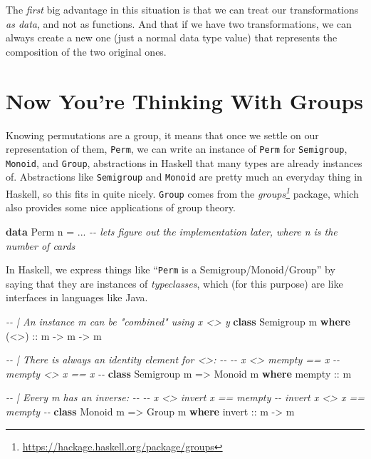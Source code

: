 \documentclass[]{article}
\newenvironment{Shaded}{}{}
\newcommand{\CommentTok}[1]{\textcolor[rgb]{0.38,0.63,0.69}{\textit{#1}}}
\newcommand{\DataTypeTok}[1]{\textcolor[rgb]{0.56,0.13,0.00}{#1}}
\newcommand{\KeywordTok}[1]{\textcolor[rgb]{0.00,0.44,0.13}{\textbf{#1}}}
\newcommand{\NormalTok}[1]{#1}
\newcommand{\OperatorTok}[1]{\textcolor[rgb]{0.40,0.40,0.40}{#1}}
\newcommand{\OtherTok}[1]{\textcolor[rgb]{0.00,0.44,0.13}{#1}}
\renewcommand{\href}[2]{#2\footnote{\url{#1}}}
\begin{document}
The \emph{first} big advantage in this situation is that we can treat our
transformations \emph{as data}, and not as functions. And that if we have two
transformations, we can always create a new one (just a normal data type value)
that represents the composition of the two original ones.

\hypertarget{now-youre-thinking-with-groups}{%
\section{Now You're Thinking With Groups}\label{now-youre-thinking-with-groups}}

Knowing permutations are a group, it means that once we settle on our
representation of them, \texttt{Perm}, we can write an instance of \texttt{Perm}
for \texttt{Semigroup}, \texttt{Monoid}, and \texttt{Group}, abstractions in
Haskell that many types are already instances of. Abstractions like
\texttt{Semigroup} and \texttt{Monoid} are pretty much an everyday thing in
Haskell, so this fits in quite nicely. \texttt{Group} comes from the
\emph{\href{https://hackage.haskell.org/package/groups}{groups}} package, which
also provides some nice applications of group theory.

\begin{Shaded}
\begin{Highlighting}[]
\KeywordTok{data} \DataTypeTok{Perm}\NormalTok{ n }\OtherTok{=} \OperatorTok{...} \CommentTok{{-}{-} let\textquotesingle{}s figure out the implementation later, where n is the number of cards}
\end{Highlighting}
\end{Shaded}

In Haskell, we express things like ``\texttt{Perm} is a Semigroup/Monoid/Group''
by saying that they are instances of \emph{typeclasses}, which (for this
purpose) are like interfaces in languages like Java.

\begin{Shaded}
\begin{Highlighting}[]
\CommentTok{{-}{-} | An instance m can be "combined" using \textasciigrave{}x <> y\textasciigrave{}}
\KeywordTok{class} \DataTypeTok{Semigroup}\NormalTok{ m }\KeywordTok{where}
\OtherTok{    (<>) ::}\NormalTok{ m }\OtherTok{{-}>}\NormalTok{ m }\OtherTok{{-}>}\NormalTok{ m}

\CommentTok{{-}{-} | There is always an identity element for <>:}
\CommentTok{{-}{-}}
\CommentTok{{-}{-} x <> mempty == x}
\CommentTok{{-}{-} mempty <> x == x}
\CommentTok{{-}{-}}
\KeywordTok{class} \DataTypeTok{Semigroup}\NormalTok{ m }\OtherTok{=>} \DataTypeTok{Monoid}\NormalTok{ m }\KeywordTok{where}
\OtherTok{    mempty ::}\NormalTok{ m}

\CommentTok{{-}{-} | Every m has an inverse:}
\CommentTok{{-}{-}}
\CommentTok{{-}{-} x <> invert x == mempty}
\CommentTok{{-}{-} invert x <> x == mempty}
\CommentTok{{-}{-}}
\KeywordTok{class} \DataTypeTok{Monoid}\NormalTok{ m }\OtherTok{=>} \DataTypeTok{Group}\NormalTok{ m }\KeywordTok{where}
\OtherTok{    invert ::}\NormalTok{ m }\OtherTok{{-}>}\NormalTok{ m}
\end{Highlighting}
\end{Shaded}
\end{document}
